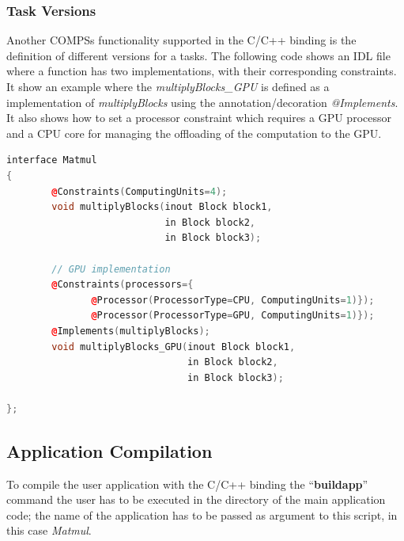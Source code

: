 \subsubsection{Task Versions}
Another COMPSs functionality supported in the C/C++ binding is the definition of different versions for a tasks. 
The following code shows an IDL file where a function has two implementations, with their corresponding constraints. 
It show an example where the \textit{multiplyBlocks\_GPU} is defined as a implementation of \textit{multiplyBlocks} using the annotation/decoration \textit{@Implements}. 
It also shows how to set a processor constraint which requires a GPU processor and a CPU core for managing the offloading of the computation to the GPU. 
\begin{lstlisting}[language=C++]
interface Matmul
{
        @Constraints(ComputingUnits=4);
        void multiplyBlocks(inout Block block1, 
                            in Block block2,
                            in Block block3);

        // GPU implementation 
        @Constraints(processors={
               @Processor(ProcessorType=CPU, ComputingUnits=1)});
               @Processor(ProcessorType=GPU, ComputingUnits=1)});
        @Implements(multiplyBlocks);
        void multiplyBlocks_GPU(inout Block block1,
                                in Block block2, 
                                in Block block3); 
                          
};
\end{lstlisting}



\subsection{Application Compilation}
To compile the user application with the C/C++ binding  the ``{\bf buildapp}'' command the user has to be executed in the directory of the main application code; 
the name of the application has to be passed as argument to this script, in this case \textit{Matmul}.

